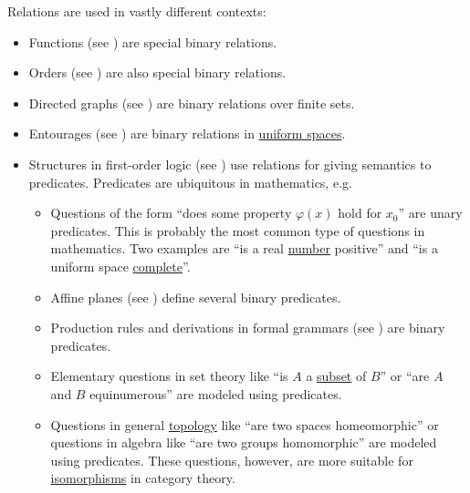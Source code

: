 \begin{example}\label{ex:relation}
  Relations are used in vastly different contexts:
  \begin{itemize}
    \item Functions (see ) are special binary relations.
    \item Orders (see ) are also special binary relations.
    \item Directed graphs (see ) are binary relations over finite sets.
    \item Entourages (see ) are binary relations in \hyperref[def:uniform_space]{uniform spaces}.
    \item Structures in first-order logic (see ) use relations for giving semantics to predicates. Predicates are ubiquitous in mathematics, e.g.
          \begin{itemize}
            \item Questions of the form \enquote{does some property \( \varphi(x) \) hold for \( x_0 \)} are unary predicates. This is probably the most common type of questions in mathematics. Two examples are \enquote{is a real \hyperref[def:real_numbers]{number} positive} and \enquote{is a uniform space \hyperref[def:complete_uniform_space]{complete}}.
            \item Affine planes (see ) define several binary predicates.
            \item Production rules and derivations in formal grammars (see ) are binary predicates.
            \item Elementary questions in set theory like \enquote{is \( A \) a \hyperref[def:subset]{subset} of \( B \)} or \enquote{are \( A \) and \( B \) equinumerous} are modeled using predicates.
            \item Questions in general \hyperref[sec:general_topology]{topology} like \enquote{are two spaces homeomorphic} or questions in algebra like \enquote{are two groups homomorphic} are modeled using predicates. These questions, however, are more suitable for \hyperref[def:morphism_invertibility/isomorphism]{isomorphisms} in category theory.
          \end{itemize}
  \end{itemize}
\end{example}

